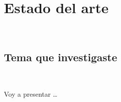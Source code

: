 \chapter{Estado del arte}
~\label{cap:art}

\section{Tema que investigaste}
~\label{cap:art:sec:tema}

Voy a presentar \ldots
